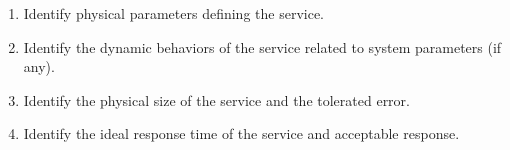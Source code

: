\begin{enumerate}
  \item Identify physical parameters defining the service.
  \item Identify the dynamic behaviors of the service related to system parameters (if any).
  \item Identify the physical size of the service and the tolerated error. %
  \item Identify the ideal response time of the service and acceptable response.

\end{enumerate}
